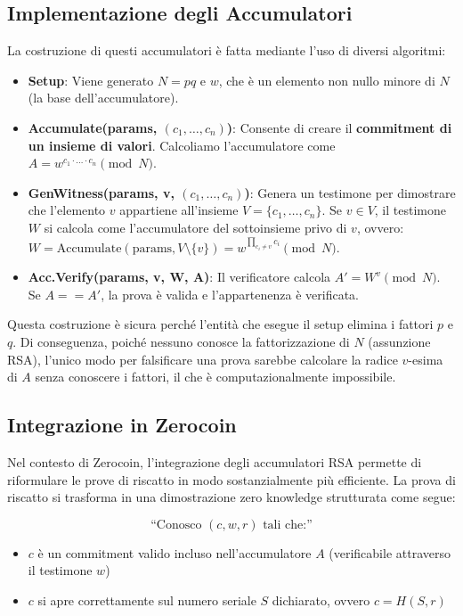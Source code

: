 \subsection{Implementazione degli Accumulatori}
La costruzione di questi accumulatori è fatta mediante l'uso di diversi algoritmi:
\begin{itemize}
    \item \textbf{Setup}: Viene generato $N = pq$ e $w$, che è un elemento non nullo minore di $N$ (la base dell'accumulatore). 
    \item \textbf{Accumulate(params, $(c_1,\dots, c_n)$)}: Consente di creare il \textbf{commitment di un insieme di valori}. Calcoliamo l'accumulatore come $A = w^{c_1 \cdot \dots \cdot c_n} \pmod N$.
    \item \textbf{GenWitness(params, v, $(c_1,\dots, c_n)$)}: Genera un testimone per dimostrare che l'elemento $v$ appartiene all'insieme $V = \{c_1,\dots, c_n\}$. Se $v \in V$, il testimone $W$ si calcola come l'accumulatore del sottoinsieme privo di $v$, ovvero: $W = \text{Accumulate}(\text{params}, V \setminus \{v\}) = w^{\prod_{c_i \neq v} c_i} \pmod N$.
    \item \textbf{Acc.Verify(params, v, W, A)}: Il verificatore calcola $A' = W^v \pmod N$. Se $A == A'$, la prova è valida e l'appartenenza è verificata.  
\end{itemize}
Questa costruzione è sicura perché l'entità che esegue il setup elimina i fattori $p$ e $q$. Di conseguenza, poiché nessuno conosce la fattorizzazione di $N$ (assunzione RSA), l'unico modo per falsificare una prova sarebbe calcolare la radice $v$-esima di $A$ senza conoscere i fattori, il che è computazionalmente impossibile.

\subsection{Integrazione in Zerocoin}
Nel contesto di Zerocoin, l'integrazione degli accumulatori RSA permette di riformulare le prove di riscatto in modo sostanzialmente più efficiente. La prova di riscatto si trasforma in una dimostrazione zero knowledge strutturata come segue:

\begin{equation}
    \text{``Conosco } (c, w, r) \text{ tali che:''}
\end{equation}

\begin{itemize}
    \item $c$ è un commitment valido incluso nell'accumulatore $A$ (verificabile attraverso il testimone $w$)
    \item $c$ si apre correttamente sul numero seriale $S$ dichiarato, ovvero $c = H(S, r)$
\end{itemize}

